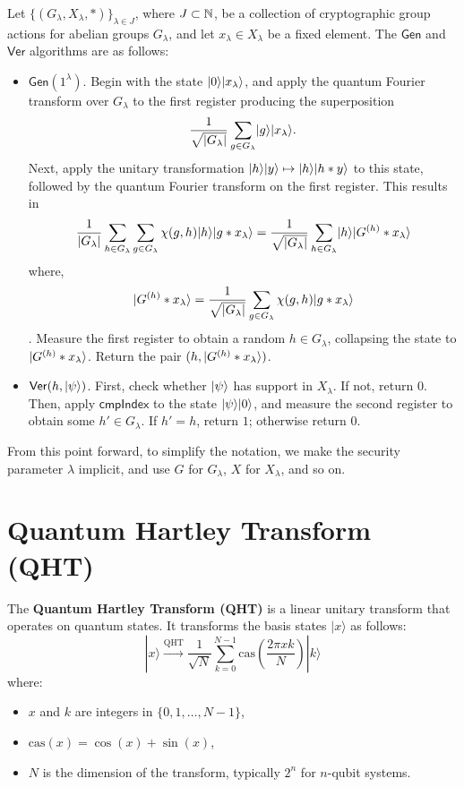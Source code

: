 \documentclass[11pt]{article}
\theoremstyle{definition}
\newcommand{\comph}{\mathsf{cmpIndex}}
\newcommand{\gen}{\mathsf{Gen}}
\newcommand{\ver}{\mathsf{Ver}}
\begin{document}
\vspace{0.5cm}
Let $\{(G_\lambda, X_\lambda, *)\}_{\lambda \in J}$, where $J \subset \mathbb{N}$, be a collection of cryptographic group actions for abelian groups $G_\lambda$, and let $x_\lambda \in X_\lambda$ be a fixed element. The $\gen$ and $\ver$ algorithms are as follows:
\begin{itemize}
\item $\gen(1^\lambda)$. Begin with the state $\lvert0\rangle\lvert x_\lambda\rangle$, and apply the quantum Fourier transform over $G_\lambda$ to the first register producing the superposition
    \[ \frac{1}{\sqrt{\lvert G_\lambda\rvert}} \sum_{g \in G_\lambda} \lvert g\rangle\lvert x_\lambda\rangle. \]
    Next, apply the unitary transformation $\lvert h\rangle\lvert y\rangle \mapsto \lvert h\rangle\lvert h * y\rangle$ to this state, followed by the quantum Fourier transform on the first register. This results in
    \[ \frac{1}{\lvert G_\lambda\rvert} \sum_{h \in G_\lambda} \sum_{g \in G_\lambda} \chi(g, h) \lvert h\rangle\lvert g * x_\lambda\rangle = \frac{1}{\sqrt{\lvert G_\lambda\rvert}} \sum_{h \in G_\lambda} \lvert h\rangle \lvert G^{(h)} * x_\lambda\rangle \]
    where,
    \[
    \lvert G^{(h)}*x_\lambda\rangle = \frac{1}{\sqrt{|G_\lambda|}}\sum_{g \in G_\lambda}\chi(g,h)\lvert g*x_\lambda\rangle
    \]
    . Measure the first register to obtain a random $h \in G_\lambda$, collapsing the state to $\lvert G^{(h)} * x_\lambda\rangle$. Return the pair $(h, \lvert G^{(h)} * x_\lambda\rangle)$.

\item $\ver(h, \ket{\psi})$. First, check whether $\lvert\psi\rangle$ has support in $X_\lambda$. If not, return $0$. Then, apply $\comph$ to the state $\lvert\psi\rangle\lvert0\rangle$, and measure the second register to obtain some $h' \in G_\lambda$. If $h' = h$, return $1$; otherwise return $0$.
\end{itemize}

From this point forward, to simplify the notation, we make the security parameter $\lambda$ implicit, and use $G$ for $G_\lambda$, $X$ for $X_\lambda$, and so on. 




\section*{Quantum Hartley Transform (QHT)}

The \textbf{Quantum Hartley Transform (QHT)} is a linear unitary transform that operates on quantum states. It transforms the basis states \( |x\rangle \) as follows:
\[
|x\rangle \xrightarrow{\text{QHT}} \frac{1}{\sqrt{N}} \sum_{k=0}^{N-1} \text{cas}\left(\frac{2\pi x k}{N}\right) |k\rangle
\]
where:
\begin{itemize}
    \item \( x \) and \( k \) are integers in \( \{0, 1, \dots, N-1\} \),
    \item \( \text{cas}(x) = \cos(x) + \sin(x) \),
    \item \( N \) is the dimension of the transform, typically \( 2^n \) for \( n \)-qubit systems.
\end{itemize}
\end{document}
